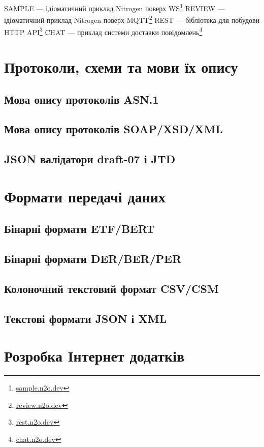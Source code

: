 SAMPLE --- ідіоматичний приклад Nitrogen поверх WS\footnote{\url{sample.n2o.dev}}
REVIEW --- ідіоматичний приклад Nitrogen поверх MQTT\footnote{\url{review.n2o.dev}}
REST --- бібліотека для побудови HTTP API\footnote{\url{rest.n2o.dev}}
CHAT --- приклад системи доставки повідомлень\footnote{\url{chat.n2o.dev}}

\newpage
\section{Протоколи, схеми та мови їх опису}

\subsection{Мова опису протоколів ASN.1}

\subsection{Мова опису протоколів SOAP/XSD/XML}

\subsection{JSON валідатори draft-07 і JTD}

\section{Формати передачі даних}

\subsection{Бінарні формати ETF/BERT}

\subsection{Бінарні формати DER/BER/PER}

\subsection{Колоночний текстовий формат CSV/CSM}

\subsection{Текстові формати JSON і XML}

\newpage
\section{Розробка Інтернет додатків}

